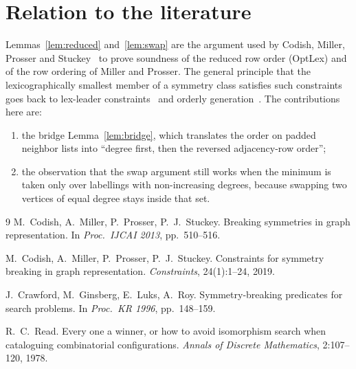 \documentclass[11pt,a4paper]{article}
\theoremstyle{definition}
\theoremstyle{remark}
\begin{document}
\section{Relation to the literature}

Lemmas~\ref{lem:reduced} and~\ref{lem:swap} are the argument used by Codish, Miller, Prosser
and Stuckey~\cite{codish13,codish19} to prove soundness of the reduced row order
(OptLex) and of the row ordering of Miller and Prosser. The general principle that the
lexicographically smallest member of a symmetry class satisfies such constraints goes back to
lex-leader constraints~\cite{crawford96} and orderly generation~\cite{read78}.
The contributions here are:
\begin{enumerate}
  \item the bridge Lemma~\ref{lem:bridge}, which translates the order on padded neighbor lists
  into ``degree first, then the reversed adjacency-row order'';
  \item the observation that the swap argument still works when the minimum is taken only over
  labellings with non-increasing degrees, because swapping two vertices of equal degree stays
  inside that set.
\end{enumerate}

\begin{thebibliography}{9}
M.~Codish, A.~Miller, P.~Prosser, P.~J.~Stuckey.
\newblock Breaking symmetries in graph representation.
\newblock In \emph{Proc.\ IJCAI 2013}, pp.~510--516.

M.~Codish, A.~Miller, P.~Prosser, P.~J.~Stuckey.
\newblock Constraints for symmetry breaking in graph representation.
\newblock \emph{Constraints}, 24(1):1--24, 2019.

J.~Crawford, M.~Ginsberg, E.~Luks, A.~Roy.
\newblock Symmetry-breaking predicates for search problems.
\newblock In \emph{Proc.\ KR 1996}, pp.~148--159.

R.~C.~Read.
\newblock Every one a winner, or how to avoid isomorphism search when cataloguing
combinatorial configurations.
\newblock \emph{Annals of Discrete Mathematics}, 2:107--120, 1978.
\end{thebibliography}
\end{document}
